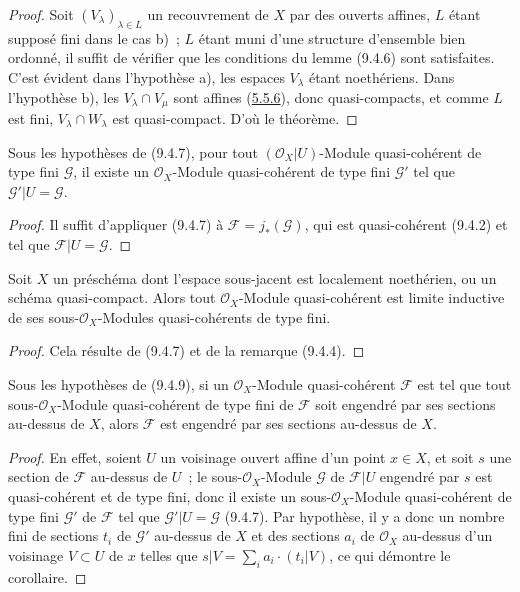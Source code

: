 
\begin{proof}
Soit $(V_\lambda)_{\lambda\in L}$ un recouvrement de $X$ par des ouverts
affines, $L$ étant supposé fini dans le cas b)~; $L$ étant muni d'une
structure d'ensemble bien ordonné, il suffit de vérifier que les conditions
du lemme (9.4.6) sont satisfaites. C'est évident dans l'hypothèse a), les
espaces $V_\lambda$ étant noethériens. Dans l'hypothèse b), les
$V_\lambda\cap V_\mu$ sont affines (\hyperref[I.5.5.6-fr]{5.5.6}), donc
quasi-compacts, et comme $L$ est fini, $V_\lambda\cap W_\lambda$ est
quasi-compact. D'où le théorème.
\end{proof}

\begin{corollary}[9.4.8]
\label{I.9.4.8-fr}
Sous les hypothèses de (9.4.7), pour tout $(\mathscr{O}_X|U)$-Module
quasi-cohérent de type fini $\mathscr{G}$, il existe un
$\mathscr{O}_X$-Module quasi-cohérent de type fini $\mathscr{G}'$ tel que
$\mathscr{G}'|U=\mathscr{G}$.
\end{corollary}

\begin{proof}
Il suffit d'appliquer (9.4.7) à $\mathscr{F}=j_*(\mathscr{G})$, qui est
quasi-cohérent (9.4.2) et tel que $\mathscr{F}|U=\mathscr{G}$.
\end{proof}

\begin{corollary}[9.4.9]
\label{I.9.4.9-fr}
Soit $X$ un préschéma dont l'espace sous-jacent est localement noethérien, ou
un schéma quasi-compact. Alors tout $\mathscr{O}_X$-Module quasi-cohérent est
limite inductive de ses sous-$\mathscr{O}_X$-Modules quasi-cohérents de type
fini.
\end{corollary}

\begin{proof}
Cela résulte de (9.4.7) et de la remarque (9.4.4).
\end{proof}

\begin{corollary}[9.4.10]
\label{I.9.4.10-fr}
Sous les hypothèses de (9.4.9), si un $\mathscr{O}_X$-Module quasi-cohérent
$\mathscr{F}$ est tel que tout sous-$\mathscr{O}_X$-Module quasi-cohérent de
type fini de $\mathscr{F}$ soit engendré par ses sections au-dessus de $X$,
alors $\mathscr{F}$ est engendré par ses sections au-dessus de $X$.
\end{corollary}

\begin{proof}
En effet, soient $U$ un voisinage ouvert affine d'un point $x\in X$, et soit
$s$ une section de $\mathscr{F}$ au-dessus de $U$~; le
sous-$\mathscr{O}_X$-Module $\mathscr{G}$ de $\mathscr{F}|U$ engendré par
$s$ est quasi-cohérent et de type fini, donc il existe un
sous-$\mathscr{O}_X$-Module quasi-cohérent de type fini $\mathscr{G}'$ de
$\mathscr{F}$ tel que $\mathscr{G}'|U=\mathscr{G}$ (9.4.7). Par hypothèse,
il y a donc un nombre fini de sections $t_i$ de $\mathscr{G}'$ au-dessus de
$X$ et des sections $a_i$ de $\mathscr{O}_X$ au-dessus d'un voisinage
$V\subset U$ de $x$ telles que
$s|V=\sum_i a_i\mathbin{\cdot}(t_i|V)$, ce qui démontre le corollaire.
\end{proof}

